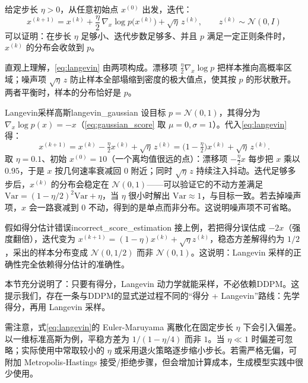 给定步长 $\eta > 0$，从任意初始点 $x^{(0)}$ 出发，迭代：
\begin{equation}\label{eq:langevin}
x^{(k+1)} = x^{(k)} + \frac{\eta}{2}\, \nabla_x \log p\big(x^{(k)}\big) + \sqrt{\eta}\, z^{(k)}, \qquad z^{(k)} \sim \mathcal{N}(0, I)
\end{equation}
可以证明：在步长 $\eta$ 足够小、迭代步数足够多、并且 $p$ 满足一定正则条件时，$x^{(k)}$ 的分布会收敛到 $p$。

直观上理解，\eqref{eq:langevin} 由两项构成。漂移项 $\frac{\eta}{2}\nabla_x\log p$ 把样本推向高概率区域；噪声项 $\sqrt{\eta}\,z$ 防止样本全部塌缩到密度的极大值点，使其按 $p$ 的形状散开。两者平衡时，样本的分布恰好是 $p$。

\begin{example}{Langevin采样高斯}{langevin_gaussian}
    设目标 $p=\mathcal N(0,1)$，其得分为 $\nabla_x\log p(x)=-x$（\eqref{eq:gaussian_score}  取 $\mu=0,\sigma=1$）。代入\eqref{eq:langevin} 得：
\begin{equation}
x^{(k+1)} = x^{(k)} - \tfrac{\eta}{2}x^{(k)} + \sqrt{\eta}\,z^{(k)} = \big(1-\tfrac{\eta}{2}\big)x^{(k)} + \sqrt{\eta}\,z^{(k)}.
\end{equation}
取 $\eta=0.1$、初始 $x^{(0)}=10$（一个离均值很远的点）：漂移项 $-\tfrac{\eta}{2}x$ 每步把 $x$ 乘以 $0.95$，于是 $x$ 按几何速率衰减回 $0$ 附近；同时 $\sqrt{\eta}\,z$ 持续注入抖动。迭代足够多步后，$x^{(k)}$ 的分布会稳定在 $\mathcal N(0,1)$——可以验证它的不动方差满足 $\mathrm{Var}=(1-\eta/2)^2\mathrm{Var}+\eta$，当 $\eta$ 很小时解出 $\mathrm{Var}\approx1$，与目标一致。若去掉噪声项，$x$ 会一路衰减到 $0$ 不动，得到的是单点而非分布。这说明噪声项不可省略。
\end{example}

\begin{example}{假如得分估计错误}{incorrect_score_estimation}
    接上例，若把得分误估成 $-2x$（强度翻倍），迭代变为 $x^{(k+1)}=(1-\eta)x^{(k)}+\sqrt\eta z^{(k)}$，稳态方差解得约为 $1/2$，采出的样本分布变成 $\mathcal N(0,1/2)$ 而非 $\mathcal N(0,1)$。这说明：Langevin 采样的正确性完全依赖得分估计的准确性。
\end{example}

本节充分说明了：只要有得分，Langevin 动力学就能采样，不必依赖DDPM。这提示我们，存在一条与DDPM的显式逆过程不同的“得分 + Langevin”路线：先学得分，再用 Langevin 采样。

需注意，式\eqref{eq:langevin}的 Euler-Maruyama 离散化在固定步长 $\eta$ 下会引入偏差。以一维标准高斯为例，平稳方差为 $1/(1-\eta/4)$ 而非 $1$。当 $\eta \ll 1$ 时偏差可忽略；实际使用中常取较小的 $\eta$ 或采用退火策略逐步缩小步长。若需严格无偏，可附加 Metropolis-Hastings 接受/拒绝步骤\cite{Metropolis1953,Hastings1970}，但会增加计算成本，生成模型实践中很少使用。

